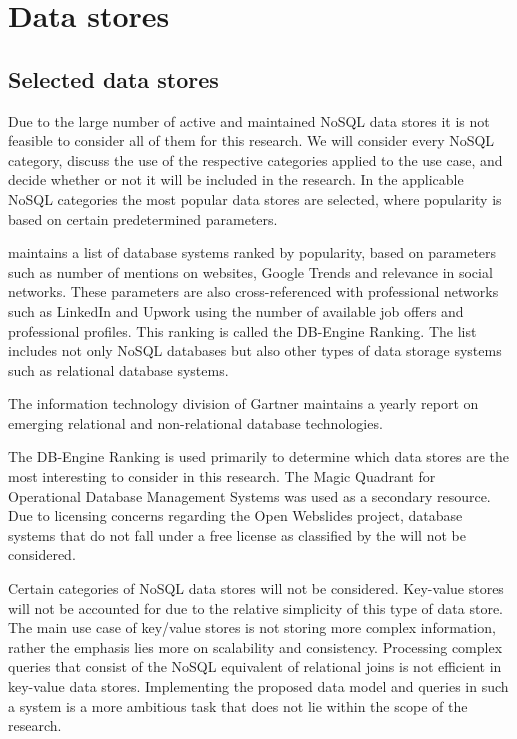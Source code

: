 \chapter{Data stores}
\label{ch:data-stores}

\section{Selected data stores}
\label{sec:selected-data-stores}

Due to the large number of active and maintained NoSQL data stores it is not feasible to consider all of them for this research.
We will consider every NoSQL category, discuss the use of the respective categories applied to the use case, and decide whether or not it will be included in the research.
In the applicable NoSQL categories the most popular data stores are selected, where popularity is based on certain predetermined parameters.

\textcite{DBEngine2018} maintains a list of database systems ranked by popularity, based on parameters such as number of mentions on websites, Google Trends and relevance in social networks.
These parameters are also cross-referenced with professional networks such as LinkedIn and Upwork using the number of available job offers and professional profiles.
This ranking is called the DB-Engine Ranking.
The list includes not only NoSQL databases but also other types of data storage systems such as relational database systems.

The information technology division of Gartner maintains a yearly report on emerging relational and non-relational database technologies.

The DB-Engine Ranking is used primarily to determine which data stores are the most interesting to consider in this research.
The Magic Quadrant for Operational Database Management Systems was used as a secondary resource.
Due to licensing concerns regarding the Open Webslides project, database systems that do not fall under a free license as classified by the \textcite{FreeSoftwareFoundation1985} will not be considered.

Certain categories of NoSQL data stores will not be considered.
Key-value stores will not be accounted for due to the relative simplicity of this type of data store.
The main use case of key/value stores is not storing more complex information, rather the emphasis lies more on scalability and consistency.
Processing complex queries that consist of the NoSQL equivalent of relational joins is not efficient in key-value data stores.
Implementing the proposed data model and queries in such a system is a more ambitious task that does not lie within the scope of the research.

